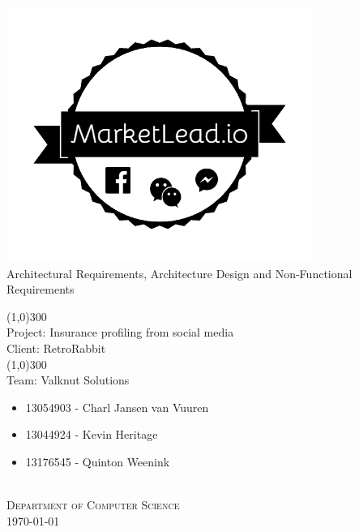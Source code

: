 \documentclass{article}
\begin{document}
	\begin{titlepage}
		\begin{center}
			\includegraphics[width=10cm]{images/marketlead_3.png}  \\
			[0.5cm]
			\huge{
			Architectural Requirements, Architecture Design and Non-Functional Requirements\\
			}

			\line(1,0){300}\\
			[0.2cm]
			\LARGE{Project: Insurance profiling from social media\\
			Client: RetroRabbit} \\
			\line(1,0){300}\\
			\LARGE{Team: Valknut Solutions}\\
			[1.0cm]
			\large
			{
			\begin{itemize}
				\item 13054903 - Charl Jansen van Vuuren
				\item 13044924 - Kevin Heritage
				\item 13176545 - Quinton Weenink\\
			\end{itemize}
			}
			\textsc{\large}\\
		[2.0cm]
		\textsc{\large  Department of Computer Science}\\
		[0.5cm]
		\textsc{\large \today}\\
		\end{center}


	\end{titlepage}
	\cleardoublepage
	\tableofcontents
	\cleardoublepage
\end{document}
